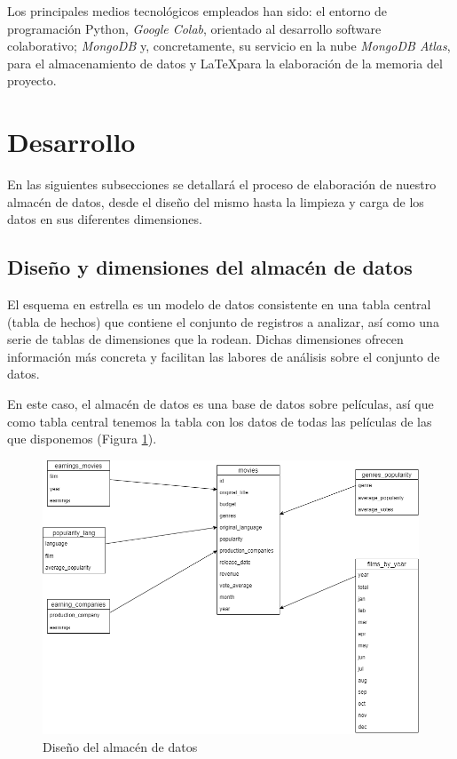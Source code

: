 \documentclass[11pt,a4paper]{article}
\begin{document}
Los principales medios tecnológicos empleados han sido: el entorno de programación Python, \textit{Google Colab}, orientado al desarrollo software colaborativo; \textit{MongoDB} y, concretamente, su servicio en la nube \textit{MongoDB Atlas}, para el almacenamiento de datos y \LaTeX para la elaboración de la memoria del proyecto.

\newpage
\section{Desarrollo}

En las siguientes subsecciones se detallará el proceso de elaboración de nuestro almacén de datos, desde el diseño del mismo hasta la limpieza y carga de los datos en sus diferentes dimensiones.

\subsection{Diseño y dimensiones del almacén de datos}

El esquema en estrella es un modelo de datos consistente en una tabla central (tabla de hechos) que contiene el conjunto de registros a analizar, así como una serie de tablas de dimensiones que la rodean. Dichas dimensiones ofrecen información más concreta y facilitan las labores de análisis sobre el conjunto de datos.

En este caso, el almacén de datos es una base de datos sobre películas, así que como tabla central tenemos la tabla con los datos de todas las películas de las que disponemos (Figura \ref{fig:almacen}).

\begin{figure}[h]
	\centering
	\includegraphics[width=0.9\linewidth]{./images/design.png} 
	\caption{Diseño del almacén de datos}
	\label{fig:almacen}
\end{figure}
\end{document}
